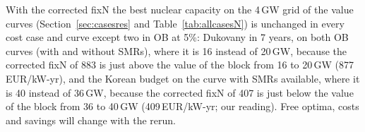 With the corrected fixN the best nuclear capacity on the 4\,GW grid of the value curves (Section~\ref{sec:casesres} and Table~\ref{tab:allcasesN}) is unchanged in every cost case and curve except two in OB at 5\%: Dukovany in 7 years, on both OB curves (with and without SMRs), where it is 16 instead of 20\,GW, because the corrected fixN of 883 is just above the value of the block from 16 to 20\,GW (877\,EUR/kW-yr), and the Korean budget on the curve with SMRs available, where it is 40 instead of 36\,GW, because the corrected fixN of 407 is just below the value of the block from 36 to 40\,GW (409\,EUR/kW-yr; our reading). Free optima, costs and savings will change with the rerun.
